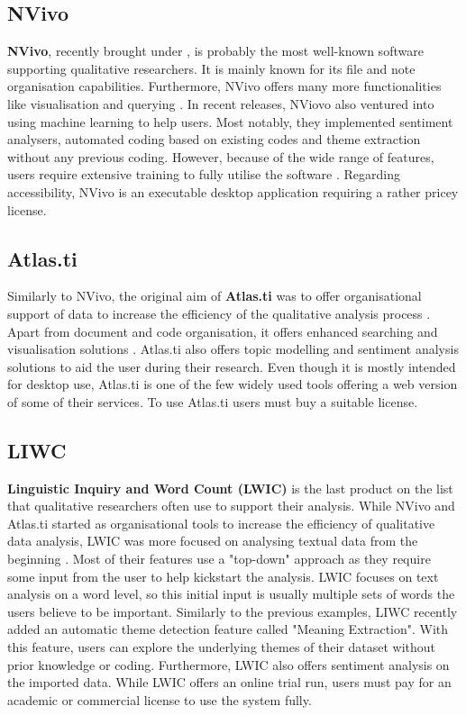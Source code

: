 \documentclass{l4proj}
\begin{document}
\subsection{NVivo}
\textbf{NVivo}, recently brought under \cite{nvivo_site}, is probably the most well-known software supporting qualitative researchers. It is mainly known for its file and note organisation capabilities. Furthermore, NVivo offers many more functionalities like visualisation and querying \citep{hilal2013using}. In recent releases, NViovo also ventured into using machine learning to help users. Most notably, they implemented sentiment analysers, automated coding based on existing codes and theme extraction without any previous coding. However, because of the wide range of features, users require extensive training to fully utilise the software \citep{chandra2019computer}. Regarding accessibility, NVivo is an executable desktop application requiring a rather pricey license.

\subsection{Atlas.ti}
Similarly to NVivo, the original aim of \textbf{Atlas.ti} was to offer organisational support of data to increase the efficiency of the qualitative analysis process \citep{atlasti_site}. Apart from document and code organisation, it offers enhanced searching and visualisation solutions \citep{soratto2020thematic}. Atlas.ti also offers topic modelling and sentiment analysis solutions to aid the user during their research. Even though it is mostly intended for desktop use, Atlas.ti is one of the few widely used tools offering a web version of some of their services. To use Atlas.ti users must buy a suitable license.

\subsection{LIWC}
\textbf{Linguistic Inquiry and Word Count (LWIC)} is the last product on the list that qualitative researchers often use to support their analysis. While NVivo and Atlas.ti started as organisational tools to increase the efficiency of qualitative data analysis, LWIC was more focused on analysing textual data from the beginning \citep{liwc_site}. Most of their features use a "top-down" approach as they require some input from the user to help kickstart the analysis. LWIC focuses on text analysis on a word level, so this initial input is usually multiple sets of words the users believe to be important.
Similarly to the previous examples, LIWC recently added an automatic theme detection feature called "Meaning Extraction". With this feature, users can explore the underlying themes of their dataset without prior knowledge or coding. Furthermore, LWIC also offers sentiment analysis on the imported data. While LWIC offers an online trial run, users must pay for an academic or commercial license to use the system fully.
\end{document}
